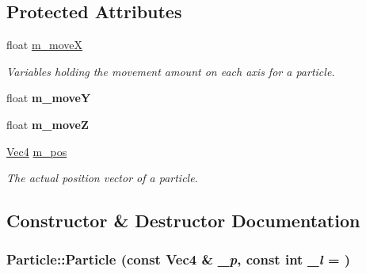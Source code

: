 \subsection*{Protected Attributes}
\begin{DoxyCompactItemize}
\item 
\hypertarget{classParticle_a7a1d6e0d428e9f2fcd933f7129022a5d}{
float \hyperlink{classParticle_a7a1d6e0d428e9f2fcd933f7129022a5d}{m\_\-moveX}}
\label{classParticle_a7a1d6e0d428e9f2fcd933f7129022a5d}

\begin{DoxyCompactList}\small\item\em Variables holding the movement amount on each axis for a particle. \item\end{DoxyCompactList}\item 
\hypertarget{classParticle_afb65ffca1b978278069595f090c60a20}{
float {\bfseries m\_\-moveY}}
\label{classParticle_afb65ffca1b978278069595f090c60a20}

\item 
\hypertarget{classParticle_a28dd76ca0c35fbb51eceb022d4809d48}{
float {\bfseries m\_\-moveZ}}
\label{classParticle_a28dd76ca0c35fbb51eceb022d4809d48}

\item 
\hypertarget{classParticle_a6bf06401e2e262e4db285978b98adbde}{
\hyperlink{classVec4}{Vec4} \hyperlink{classParticle_a6bf06401e2e262e4db285978b98adbde}{m\_\-pos}}
\label{classParticle_a6bf06401e2e262e4db285978b98adbde}

\begin{DoxyCompactList}\small\item\em The actual position vector of a particle. \item\end{DoxyCompactList}\end{DoxyCompactItemize}


\subsection{Constructor \& Destructor Documentation}
\hypertarget{classParticle_aada70e88e292f2c4185e19aa118a1406}{
\subsubsection[{Particle}]{\setlength{\rightskip}{0pt plus 5cm}Particle::Particle (const {\bf Vec4} \& {\em \_\-p}, \/  const int {\em \_\-l} = {})}}
\label{classParticle_aada70e88e292f2c4185e19aa118a1406}


